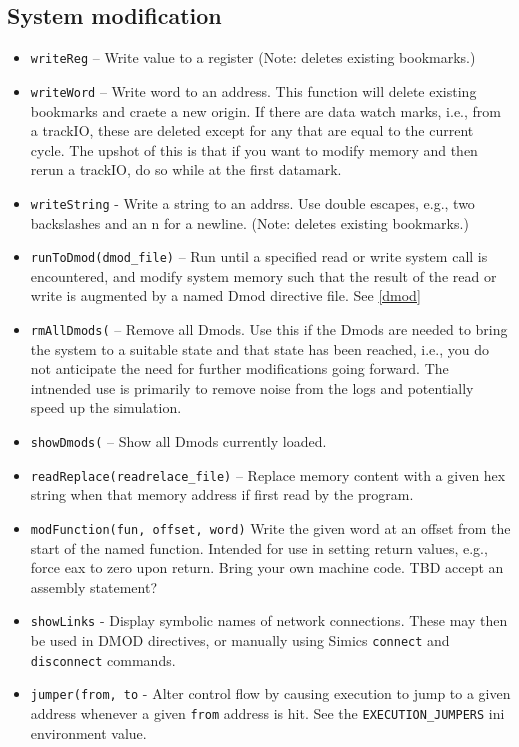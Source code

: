 \documentclass[titlepage]{article}
\begin{document}
\subsection{System modification}
\label{sec:modification}
\begin{itemize}

\item {\tt writeReg} – Write value to a register (Note: deletes existing bookmarks.)
\item {\tt writeWord} – Write word to an address. This function will delete existing bookmarks and craete a new origin.  If there are data watch marks,
i.e., from a trackIO, these are deleted except for any that are equal to the current cycle.  The upshot of this is that if you want to modify memory
and then rerun a trackIO, do so while at the first datamark.
\item {\tt writeString} - Write a string to an addrss. Use double escapes, e.g., two backslashes and an n for a newline. (Note: deletes existing bookmarks.)

\item {\tt runToDmod(dmod\_file)} – Run until a specified read or write system call is encountered, and modify system memory such
that the result of the read or write is augmented by a named Dmod directive file.  See \ref{dmod}

\item {\tt rmAllDmods(} – Remove all Dmods.  Use this if the Dmods are needed to bring the system to a suitable state and that state has been reached, i.e.,
you do not anticipate the need for further modifications going forward.  The intnended use is primarily to remove noise from the logs and potentially speed
up the simulation.

\item {\tt showDmods(} – Show all Dmods currently loaded.

\item {\tt readReplace(readrelace\_file)} – Replace memory content with a given hex string when that memory address if first read by the program.

\item {\tt modFunction(fun, offset, word)} Write the given word at an offset from the start of the named function.  Intended for use in setting return
values, e.g., force eax to zero upon return.  Bring your own machine code.  TBD accept an assembly statement?

\item {\tt showLinks} - Display symbolic names of network connections.  These may then be used in DMOD directives, or manually using Simics {\tt connect}
and {\tt disconnect} commands.

\item {\tt jumper(from, to} - Alter control flow by causing execution to jump to a given address whenever a given {\tt from} address is hit.  See
the {\tt EXECUTION\_JUMPERS} ini environment value.

\end{itemize}
\end{document}
